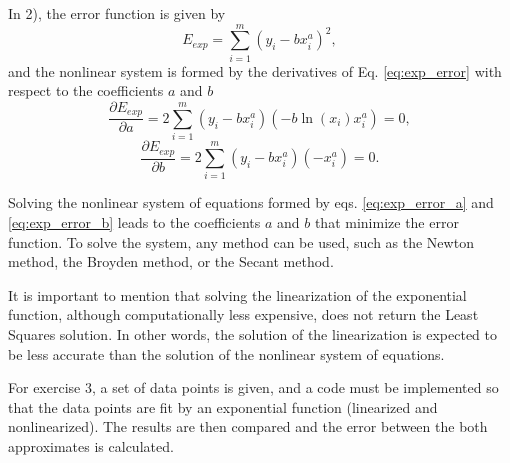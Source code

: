 In 2), the error function is given by 
\begin{equation}
    E_{exp} = \sum_{i=1}^{m} (y_i - bx_i^a)^2,
    \label{eq:exp_error}
\end{equation}
and the nonlinear system is formed by the derivatives of Eq. \eqref{eq:exp_error} with respect to the coefficients $a$ and $b$
\begin{equation}
    \frac{\partial E_{exp}}{\partial a} = 2\sum_{i=1}^{m} (y_i - bx_i^a)(-b\ln(x_i)x_i^a) = 0,
    \label{eq:exp_error_a}
\end{equation}
\begin{equation}
    \frac{\partial E_{exp}}{\partial b} = 2\sum_{i=1}^{m} (y_i - bx_i^a)(-x_i^a) = 0.
    \label{eq:exp_error_b}
\end{equation}

Solving the nonlinear system of equations formed by eqs. \eqref{eq:exp_error_a} and \eqref{eq:exp_error_b} leads to the coefficients $a$ and $b$ that minimize the error function. To solve the system, any method can be used, such as the Newton method, the Broyden method, or the Secant method.

It is important to mention that solving the linearization of the exponential function, although computationally less expensive, does not return the Least Squares solution. In other words, the solution of the linearization is expected to be less accurate than the solution of the nonlinear system of equations. 

For exercise 3, a set of data points is given, and a code must be implemented so that the data points are fit by an exponential function (linearized and nonlinearized). The results are then compared and the error between the both approximates is calculated.